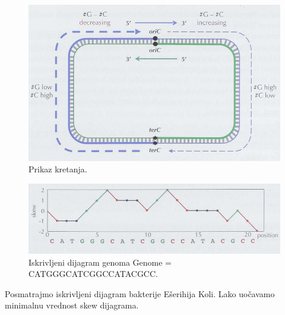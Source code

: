 \begin{figure}[h]
\centering
\includegraphics[width=1\textwidth]{poglavlja/1/slike/Polulanci_CG.png}
\caption{Prikaz kretanja.}
\end{figure} 

\begin{figure}[h]
\centering
\includegraphics[width=1\textwidth]{poglavlja/1/slike/skew.png}
\caption{Iskrivljeni dijagram genoma Genome = CATGGGCATCGGCCATACGCC.}
\end{figure} 

Posmatrajmo iskrivljeni dijagram bakterije Ešerihija Koli. Lako uočavamo minimalnu vrednost skew dijagrama.

